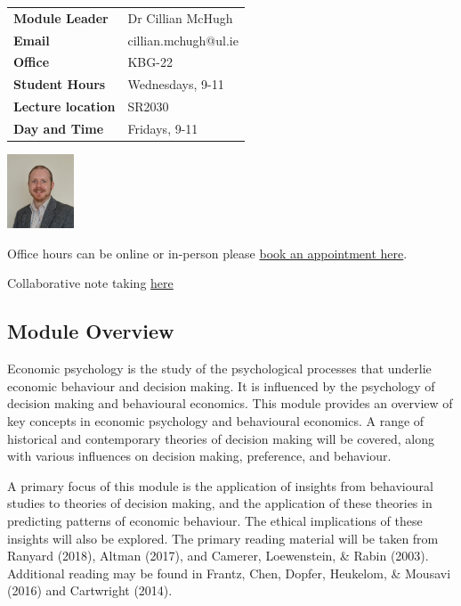 \documentclass[
  x11names]{article}
\begin{document}
\begin{minipage}{.65\textwidth}
\begin{tabular}{p{4cm} l}
\textbf{Module Leader} & Dr Cillian McHugh\\
\textbf{Email} & cillian.mchugh@ul.ie \\
\textbf{Office} & KBG-22 \\
\textbf{Student Hours} & Wednesdays, 9-11  \\
\textbf{Lecture location} & SR2030\\
\textbf{Day and Time} & Fridays, 9-11 \\
\end{tabular}
\end{minipage}
\hspace{6pt}
\begin{minipage}{.15\textwidth}
\includegraphics[width=75px]{images/cillian_face_2022e.jpg}\bigskip
\end{minipage}

\bigskip

Office hours can be online or in-person please
\color{blue}\href{https://outlook.office.com/bookwithme/user/f570b7289a5343259c60c8a5d26ce510@ul.ie/meetingtype/w1pxpwCL8UG9pt_0cg2fUA2?anonymous&ep=mlink}{book
an appointment here}\color{black}.

Collaborative note taking
\color{blue}\href{https://docs.google.com/document/d/1Yx5EbhSX0uEHzr964dLh7Xx30ZzthbCqV3T32laTl9E/edit?usp=sharing}{here}\color{black}

\subsection{Module Overview}\label{module-overview}

Economic psychology is the study of the psychological processes that
underlie economic behaviour and decision making. It is influenced by the
psychology of decision making and behavioural economics. This module
provides an overview of key concepts in economic psychology and
behavioural economics. A range of historical and contemporary theories
of decision making will be covered, along with various influences on
decision making, preference, and behaviour.

A primary focus of this module is the application of insights from
behavioural studies to theories of decision making, and the application
of these theories in predicting patterns of economic behaviour. The
ethical implications of these insights will also be explored. The
primary reading material will be taken from Ranyard (2018), Altman
(2017), and Camerer, Loewenstein, \& Rabin (2003). Additional reading
may be found in Frantz, Chen, Dopfer, Heukelom, \& Mousavi (2016) and
Cartwright (2014).
\end{document}
